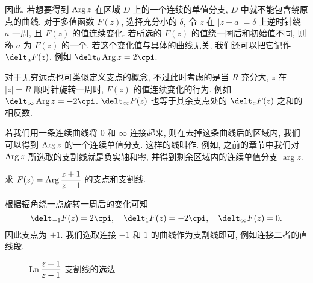 因此, 若想要得到 $\operatorname{Arg} z$ 在区域 $D$ 上的一个连续的单值分支, $D$ 中就不能包含绕原点的曲线.
对于多值函数 $F(z)$, 选择充分小的 $\delta$, 令 $z$ 在 $|z-a|=\delta$ 上逆时针绕 $a$ 一周, 且 $F(z)$ 的值连续变化.
若所选的 $F(z)$ 的值绕一圈后和初始值不同, 则称 $a$ 为 $F(z)$ 的一个.
若这个变化值与具体的曲线无关, 我们还可以把它记作 $\delt_a F(z)$.
例如 $\delt_0 \Arg z=2\cpi$.

对于无穷远点也可类似定义支点的概念, 不过此时考虑的是当 $R$ 充分大, $z$ 在 $|z|=R$ 顺时针旋转一周时, $F(z)$ 的值连续变化的行为.
例如 $\delt_\infty \Arg z=-2\cpi$.
$\delt_\infty F(z)$ 也等于其余支点处的 $\delt_a F(z)$ 之和的相反数.

若我们用一条连续曲线将 $0$ 和 $\infty$ 连接起来, 则在去掉这条曲线后的区域内, 我们可以得到 $\operatorname{Arg} z$ 的一个连续单值分支.
这样的线叫作.
例如, 之前的章节中我们对 $\operatorname{Arg} z$ 所选取的支割线就是负实轴和零, 并得到剩余区域内的连续单值分支 $\arg z$.

\begin{example}
  \label{exam:cut-arg-frac}
  求 $F(z)=\operatorname{Arg} \dfrac{z+1}{z-1}$ 的支点和支割线.
\end{example}

\begin{solution}
  根据辐角绕一点旋转一周后的变化可知
  \[
    \delt_{-1} F(z)=2\cpi,\quad
    \delt_1 F(z)=-2\cpi,\quad
    \delt_\infty F(z)=0.
  \]
  因此支点为 $\pm1$.
  我们选取连接 $-1$ 和 $1$ 的曲线作为支割线即可, 例如连接二者的直线段.
\end{solution}

\begin{figure}[!htb]
  \centering
  \caption{$\operatorname{Ln}\dfrac{z+1}{z-1}$ 支割线的选法}
\end{figure}

